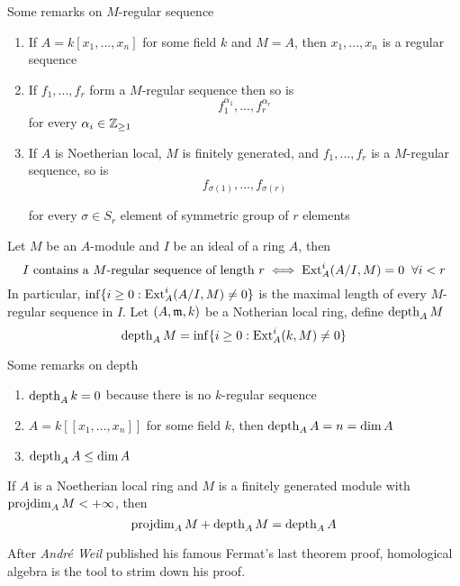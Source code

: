 \begin{remark}
	Some remarks on $M$-regular sequence
	\begin{enumerate}
		\item If $A = k[x_1, ..., x_n]$ for some field $k$ and $M = A$, then $x_1, ..., x_n$ is a regular sequence
		
		\item If $f_1, ..., f_r$ form a $M$-regular sequence then so is 
		$$
			f_1^{\alpha_1}, ..., f_r^{\alpha_r}
		$$
		for every $\alpha_i \in \mathbb{Z}_{\geq 1}$
		
		\item If $A$ is Noetherian local, $M$ is finitely generated, and $f_1, ..., f_r$ is a $M$-regular sequence, so is
		$$
			f_{\sigma(1)}, ..., f_{\sigma(r)}
		$$
		
		for every $\sigma \in S_r$ element of symmetric group of $r$ elements
	\end{enumerate}
\end{remark}

\begin{definition}[depth]
	Let $M$ be an $A$-module and $I$ be an ideal of a ring $A$, then 
	$$
		I \text{ contains a $M$-regular sequence of length } r \iff \operatorname{Ext}_A^i(A / I, M) = 0 \;\; \forall i < r
	$$
	In particular, $\inf \{i \geq 0: \operatorname{Ext}_A^i(A / I, M) \neq 0\}$ is the maximal length of every $M$-regular sequence in $I$. Let $(A, \mathfrak{m}, k)$ be a Notherian local ring, define $\operatorname{depth}_A M$
	$$
		\operatorname{depth}_A M = \inf \{i \geq 0: \operatorname{Ext}_A^i(k, M) \neq 0\}
	$$
\end{definition}

\begin{remark}
	Some remarks on depth
	\begin{enumerate}
		\item $\operatorname{depth}_A k = 0$ because there is no $k$-regular sequence
		\item $A = k[[x_1, ..., x_n]]$ for some field $k$, then $\operatorname{depth}_A A = n = \dim A$
		\item $\operatorname{depth}_A A \leq \dim A$
	\end{enumerate}
\end{remark}

\begin{theorem}
	If $A$ is a Noetherian local ring and $M$ is a finitely generated module with $\operatorname{projdim}_A M < +\infty$, then 
	$$
		\operatorname{projdim}_A M + \operatorname{depth}_A M = \operatorname{depth}_A A
	$$
\end{theorem}

After \textit{André Weil} published his famous Fermat's last theorem proof, homological algebra is the tool to strim down his proof.
